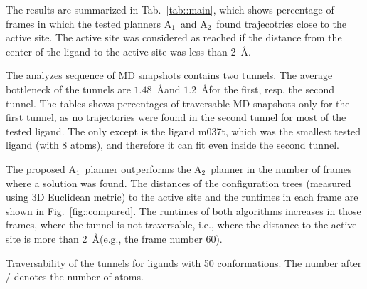 \documentclass[usletter, 10pt, conference]{ieeeconf} %
\def\RA{A$_{1}$}
\def\RB{A$_{2}$}
\begin{document}
The results are summarized in Tab.~\ref{tab::main}, which shows percentage of frames in which the tested planners \RA\ and \RB\ found
trajecotries close to the active site. 
The active site was considered as reached if the distance from the center of the ligand to the active site was less than 2~\AA.

The analyzes sequence of MD  snapshots contains two tunnels. 
The average bottleneck of the tunnels are $1.48$~\AA and $1.2$~\AA for the first, resp. the second tunnel.
The tables shows percentages of traversable MD snapshots only for the first tunnel, as no trajectories were found in the second tunnel
for most of the tested ligand.
The only except is the ligand m037t, which was the smallest tested ligand (with 8 atoms), and therefore it can fit even inside the second tunnel.

The proposed \RA\ planner outperforms the \RB\ planner in the number of frames where a solution was found.
The distances of the configuration trees (measured using 3D Euclidean metric) to the active site and the runtimes in each frame
are shown in Fig.~\ref{fig::compared}.
The runtimes of both algorithms increases in those frames, where the tunnel is not traversable, i.e., where the distance
to the active site is more than 2~\AA (e.g., the frame number 60).

\begin{table}
\centering
\caption{\label{tab::main}
    Traversability of the tunnels for ligands with 50 conformations. 
    The number after $/$ denotes the number of atoms.
}
\small
\renewcommand{\tabcolsep}{3pt}
{\small

}
\end{table}
\end{document}
